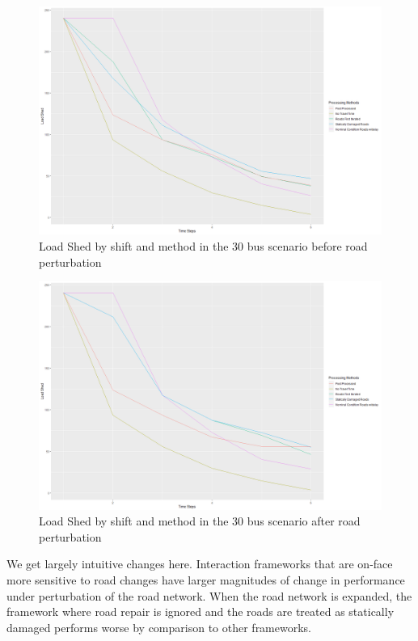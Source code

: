 \documentclass{article}
\begin{document}
	\begin{figure}[H]
		\centering
		\includegraphics[width=.9\linewidth]{Rplot30Unperturbed.png}
		\caption{Load Shed by shift and method in the 30 bus scenario before road perturbation}
		\label{fig:sub2}
		
		
	\end{figure}
	\begin{figure}[H]
	\centering
	\includegraphics[width=.9\linewidth]{Rplot30Perturbed.png}
	\caption{Load Shed by shift and method in the 30 bus scenario after road perturbation}
	\label{fig:sub2}
	
	
	\end{figure}
	
		We get largely intuitive changes here. Interaction frameworks that are on-face more sensitive to road changes have larger magnitudes of change in performance under perturbation of the road network. When the road network is expanded, the framework where road repair is ignored and the roads are treated as statically damaged performs worse by comparison to other frameworks.
	
\end{document}

